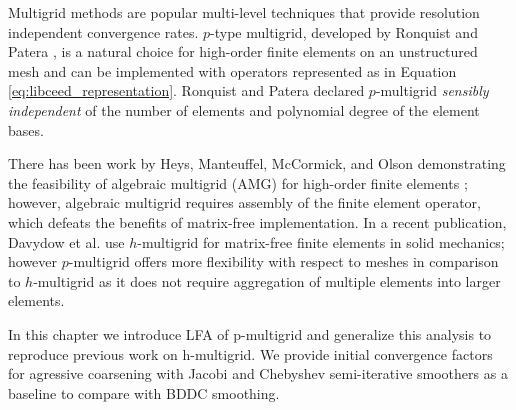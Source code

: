 Multigrid methods are popular multi-level techniques that provide resolution independent convergence rates.
$p$-type multigrid, developed by Ronquist and Patera \cite{ronquist1987spectral}, is a natural choice for high-order finite elements on an unstructured mesh and can be implemented with operators represented as in Equation \ref{eq:libceed_representation}.
Ronquist and Patera declared $p$-multigrid \textit{sensibly independent} of the number of elements and polynomial degree of the element bases.

There has been work by Heys, Manteuffel, McCormick, and Olson demonstrating the feasibility of algebraic multigrid (AMG) for high-order finite elements \cite{heys2005algebraic}; however, algebraic multigrid requires assembly of the finite element operator, which defeats the benefits of matrix-free implementation.
In a recent publication, Davydow et al. use $h$-multigrid for matrix-free finite elements in solid mechanics; however $p$-multigrid offers more flexibility with respect to meshes in comparison to $h$-multigrid as it does not require aggregation of multiple elements into larger elements.

In this chapter we introduce LFA of p-multigrid and generalize this analysis to reproduce previous work on h-multigrid.
We provide initial convergence factors for agressive coarsening with Jacobi and Chebyshev semi-iterative smoothers as a baseline to compare with BDDC smoothing.
